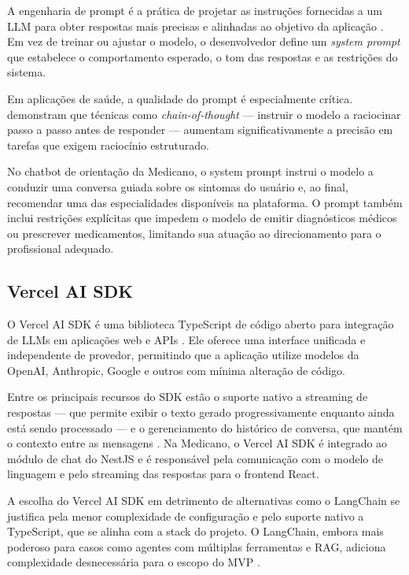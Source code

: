A engenharia de prompt é a prática de projetar as
instruções fornecidas a um LLM para obter respostas mais
precisas e alinhadas ao objetivo da aplicação
\cite{wei2022}. Em vez de treinar ou ajustar o modelo,
o desenvolvedor define um \textit{system prompt} que
estabelece o comportamento esperado, o tom das respostas
e as restrições do sistema.

Em aplicações de saúde, a qualidade do prompt é
especialmente crítica.  demonstram
que técnicas como \textit{chain-of-thought} — instruir
o modelo a raciocinar passo a passo antes de responder
— aumentam significativamente a precisão em tarefas
que exigem raciocínio estruturado.

No chatbot de orientação da Medicano, o system prompt
instrui o modelo a conduzir uma conversa guiada sobre
os sintomas do usuário e, ao final, recomendar uma
das especialidades disponíveis na plataforma. O prompt
também inclui restrições explícitas que impedem o
modelo de emitir diagnósticos médicos ou prescrever
medicamentos, limitando sua atuação ao direcionamento
para o profissional adequado.

\subsection{Vercel AI SDK}
\label{subsec:vercel-ai-sdk}

O Vercel AI SDK é uma biblioteca TypeScript de código
aberto para integração de LLMs em aplicações web e APIs
\cite{vercelaisdk2024}. Ele oferece uma interface
unificada e independente de provedor, permitindo que a
aplicação utilize modelos da OpenAI, Anthropic, Google
e outros com mínima alteração de código.

Entre os principais recursos do SDK estão o suporte
nativo a streaming de respostas — que permite exibir
o texto gerado progressivamente enquanto ainda está
sendo processado — e o gerenciamento do histórico de
conversa, que mantém o contexto entre as mensagens
\cite{vercelaisdk2024}. Na Medicano, o Vercel AI SDK
é integrado ao módulo de chat do NestJS e é responsável
pela comunicação com o modelo de linguagem e pelo
streaming das respostas para o frontend React.

A escolha do Vercel AI SDK em detrimento de alternativas
como o LangChain se justifica pela menor complexidade
de configuração e pelo suporte nativo a TypeScript, que
se alinha com a stack do projeto. O LangChain, embora
mais poderoso para casos como agentes com múltiplas
ferramentas e RAG, adiciona complexidade desnecessária
para o escopo do MVP \cite{vercelaisdk2024}.

